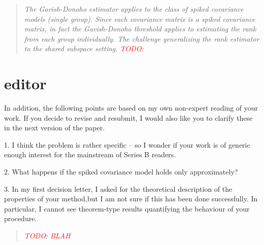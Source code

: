 \documentclass{article}
\newenvironment{resp}{\begin{quotation}\noindent\slshape}{\end{quotation}}
\newcommand{\todo}[1]{{\textsf{\textcolor{red}{TODO: #1}}}}
\begin{document}
\begin{resp}
The Gavish-Donoho estimator applies to the class of spiked covariance models (single group).  Since each covariance matrix is a spiked covariance matrix, in fact the Gavish-Donoho threshold applies to estimating the rank from each group individually.  The challenge generalizing the rank estimator to the shared subspace setting.  \todo{} 
\end{resp}

\section{editor}

In addition, the following points are based on my own non-expert reading of your work. If you decide to revise and resubmit, I would also like you to clarify these in the next version of the paper.

1. I think the problem is rather specific – so I wonder if your work is of generic enough interest for the mainstream of Series B readers.

\begin{resp}
\end{resp}

2. What happens if the spiked covariance model holds only approximately?

\begin{resp}
\end{resp}

3. In my first decision letter, I asked for the theoretical description of the properties of your method,but I am not sure if this has been done successfully. In particular, I cannot see theorem-type results quantifying the behaviour of your procedure.

\begin{resp}
\todo{BLAH}
\end{resp}
\end{document}
